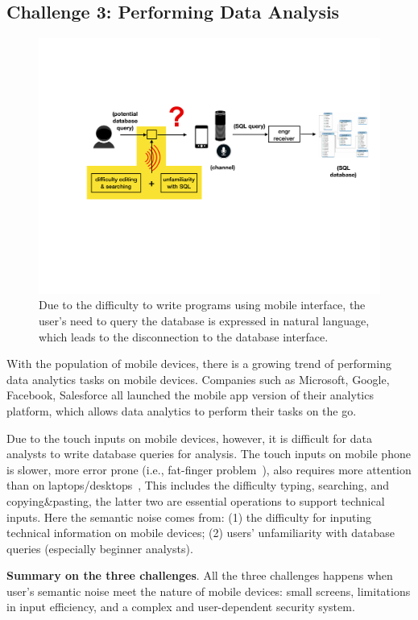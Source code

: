 \subsection{Challenge 3: Performing Data Analysis}

\begin{figure}[h]
\centering
\includegraphics[width=.85\linewidth]{figure/chapter1/gui2_challenge}
\caption{Due to the difficulty to write programs using mobile interface, the user's need to query the database is expressed in natural language, which leads to the disconnection to the database interface.\label{fig:ch1:gui2}}
\end{figure} 

With the population of mobile devices, there is a growing trend of performing data analytics tasks on mobile devices. Companies such as Microsoft, Google, Facebook, Salesforce all launched the mobile app version of their analytics platform, which allows data analytics to perform their tasks on the go. 

Due to the touch inputs on mobile devices, however, it is difficult for data analysts to write database queries for analysis. The touch inputs on mobile phone is slower, more error prone (i.e., fat-finger problem~\cite{siek2005fat}), also requires more attention than on laptops/desktops~\cite{mobiletyping}, This includes the difficulty typing, searching, and copying\&pasting, the latter two are essential operations to support technical inputs. Here the semantic noise comes from: (1) the difficulty for inputing technical information on mobile devices; (2) users' unfamiliarity with database queries (especially beginner analysts). 

\textbf{ Summary on the three challenges}. All the three challenges happens when user's semantic noise meet the nature of mobile devices: small screens, limitations in input efficiency, and a complex and user-dependent security system. 

